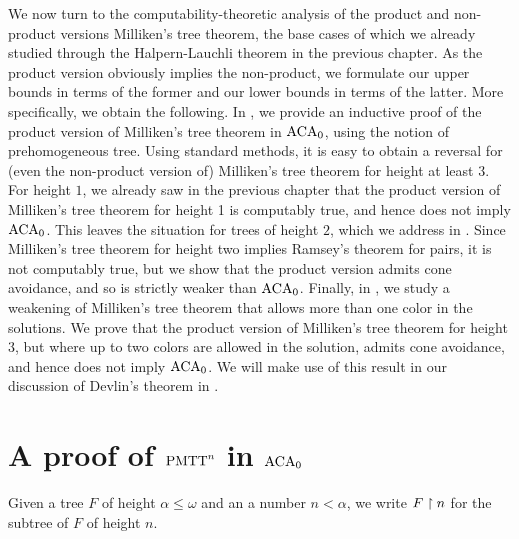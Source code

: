 
We now turn to the computability-theoretic analysis of the product and non-product versions Milliken's tree theorem, the base cases of which we already studied through the Halpern-Lauchli theorem in the previous chapter. As the product version obviously implies the non-product, we formulate our upper bounds in terms of the former and our lower bounds in terms of the latter. More specifically, we obtain the following.
In , we provide an inductive proof of the product version of Milliken's tree theorem in $\mathrm{ACA}_0$, using the notion of prehomogeneous tree. Using standard methods, it is easy to obtain a reversal for (even the non-product version of) Milliken's tree theorem for height at least $3$. For height $1$, we already saw in the previous chapter that the product version of Milliken's tree theorem for height 1 is computably true, and hence does not imply $\mathrm{ACA}_0$. This leaves the situation for trees of height $2$, which we address in . Since Milliken's tree theorem for height two implies Ramsey's theorem for pairs, it is not computably true, but we show that the product version admits cone avoidance, and so is strictly weaker than $\mathrm{ACA}_0$. Finally, in , we study a weakening of Milliken's tree theorem that allows more than one color in the solutions. We prove that the product version of Milliken's tree theorem for height 3, but where up to two colors are allowed in the solution, admits cone avoidance, and hence does not imply $\mathrm{ACA}_0$. We will make use of this result in our discussion of Devlin's theorem in .

\section{A proof of $\mathrm{PMTT}^{n}_{}$ in $\mathrm{ACA}_0$}\label{subsect:proof-pmt-aca}

Given a tree $F$ of height $\alpha \leq \omega$ and an a number $n < \alpha$,  we write $F \upharpoonright n$ \index{$\uh$} for the subtree of $F$ of height $n$.


